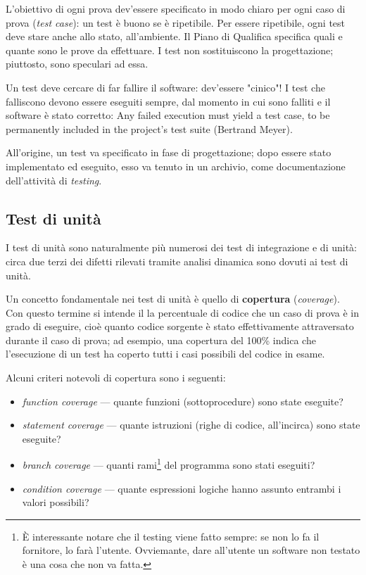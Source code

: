 \documentclass[a4paper]{article}
\begin{document}
		
L'obiettivo di ogni prova dev'essere specificato in modo chiaro per ogni caso di prova (\emph{test case}): un test è buono se è ripetibile. Per essere ripetibile, ogni test deve stare anche allo stato, all'ambiente. Il Piano di Qualifica specifica quali e quante sono le prove da effettuare. I test non sostituiscono la progettazione; piuttosto, sono speculari ad essa.
		
Un test deve cercare di far fallire il software: dev'essere "cinico"! I test che falliscono devono essere eseguiti sempre, dal momento in cui sono falliti e il software è stato corretto: Any failed execution must yield a test case, to be permanently included in the project's test suite (Bertrand Meyer).
		
All'origine, un test va specificato in fase di progettazione; dopo essere stato implementato ed eseguito, esso va tenuto in un archivio, come documentazione dell'attività di \emph{testing}.

		
	\subsection{Test di unità}

		
I test di unità sono naturalmente più numerosi dei test di integrazione e di unità: circa due terzi dei difetti rilevati tramite analisi dinamica sono dovuti ai test di unità.
		
Un concetto fondamentale nei test di unità è quello di \textbf{copertura} (\emph{coverage}). Con questo termine si intende il la percentuale di codice che un caso di prova è in grado di eseguire, cioè quanto codice sorgente è stato effettivamente attraversato durante il caso di prova; ad esempio, una copertura del 100\% indica che l'esecuzione di un test ha coperto tutti i casi possibili del codice in esame.
		
Alcuni criteri notevoli di copertura sono i seguenti:
		
	\begin{itemize}
		
			
	\item \emph{function coverage} --- quante funzioni (sottoprocedure) sono state eseguite?
			
	\item \emph{statement coverage} --- quante istruzioni (righe di codice, all'incirca) sono state eseguite?
			
	\item \emph{branch coverage} --- quanti rami\footnote{È interessante notare che il testing viene fatto sempre: se non lo fa il fornitore, lo farà l'utente. Ovviemante, dare all'utente un software non testato è una cosa che non va fatta.} del programma sono stati eseguiti?
			
	\item \emph{condition coverage} --- quante espressioni logiche hanno assunto entrambi i valori possibili?
		
	\end{itemize}
\end{document}
